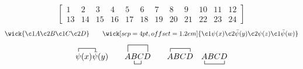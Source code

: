\documentclass{article}
\begin{document}
\[
\begin{bmatrix}1&2&3&4&5&6&7&8&9&10&11&12\\13&14&15&16&17&18&19&20&21&22&23&24\end{bmatrix}
\]
\[
\wick{\c1 A\c2 B\c1 C\c2 D}\qquad
\wick[sep=4pt,offset=1.2em]{\c1{\psi(x)}\c2{\bar\psi(y)}\c2{\psi(z)}\c1{\bar\psi(w)}}
\]
\[
\contraction{}{\psi}{(x)}{\bar\psi}\psi(x)\bar\psi(y)\qquad
\acontraction[2ex]{}{A}{BC}{D}\bcontraction{A}{B}{}{C}ABCD\qquad
\acontracted{}{A}{BC}{D}\quad\bcontracted{}{A}{BC}{D}
\]
\end{document}
